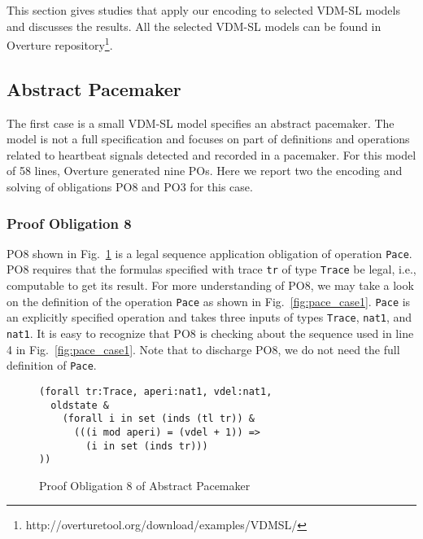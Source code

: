 This section gives studies that apply our encoding to selected VDM-SL models and discusses the results. All the selected VDM-SL models can be found in Overture repository\footnote{http://overturetool.org/download/examples/VDMSL/}.

\subsection{Abstract Pacemaker}

The first case is a small VDM-SL model specifies an abstract pacemaker. The model is not a full specification and focuses on part of definitions and operations related to heartbeat signals detected and recorded in a pacemaker. For this model of 58 lines, Overture generated nine POs. Here we report two the encoding and solving of obligations PO8 and PO3 for this case.

\subsubsection{Proof Obligation 8}

PO8 shown in Fig.~\ref{fig:po8_case1} is a legal sequence application obligation of operation {\tt Pace}.  PO8 requires that the formulas specified with trace {\tt tr} of type {\tt Trace} be legal, i.e., computable to get its result. For more understanding of PO8, we may take a look on the definition of the operation {\tt Pace} as shown in Fig.~\ref{fig:pace_case1}. {\tt Pace} is an explicitly specified operation and takes three inputs of types {\tt Trace}, {\tt nat1}, and {\tt nat1}. It is easy to recognize that PO8 is checking about the sequence used in line 4 in Fig.~\ref{fig:pace_case1}. Note that to discharge PO8, we do not need the full definition of {\tt Pace}.

\begin{figure}[t]
\begin{center}
\begin{mdframed}[roundcorner=5pt]
\begin{Verbatim}[fontsize=\small]
(forall tr:Trace, aperi:nat1, vdel:nat1,
  oldstate & 
    (forall i in set (inds (tl tr)) &
      (((i mod aperi) = (vdel + 1)) =>
        (i in set (inds tr)))
))
\end{Verbatim}
\end{mdframed}
\vspace{-10pt}
\caption{Proof Obligation 8 of Abstract Pacemaker}
\label{fig:po8_case1}
\end{center}
\end{figure}

